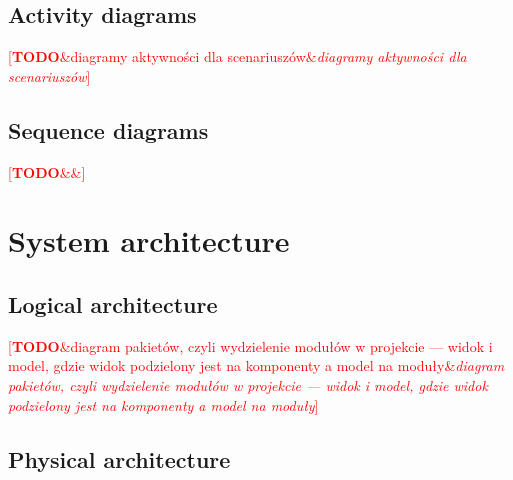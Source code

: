 \documentclass[english,engineering]{wizthesis}
\newcommand{\todo}[1]{%
  \textcolor{red}{[\textbf{TODO}\ifx&#1&{}\else{ }\fi\emph{#1}]}%
}
\begin{document}

\subsection{Activity diagrams}

\todo{diagramy aktywności dla scenariuszów}


\subsection{Sequence diagrams}

\todo{}


\section{System architecture}

\subsection{Logical architecture}

\todo{diagram pakietów, czyli wydzielenie modułów w projekcie --- widok i model,
gdzie widok podzielony jest na komponenty a model na moduły}


\subsection{Physical architecture}
\end{document}
